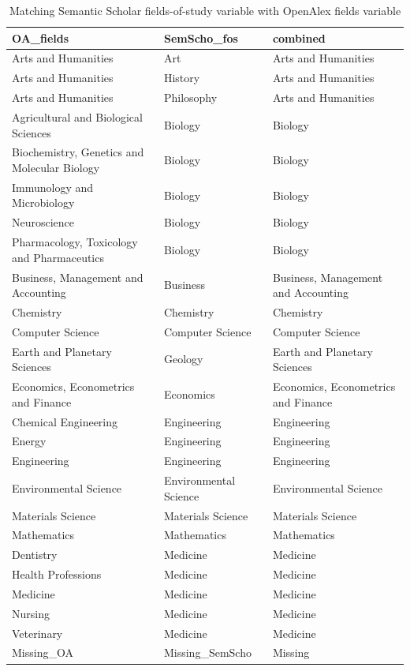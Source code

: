\begin{table}
\caption{Matching Semantic Scholar fields-of-study variable with OpenAlex fields variable}
\label{tab:fos_matching}
\begin{tabular}{lll}
\toprule
OA_fields & SemScho_fos & combined \\
\midrule
Arts and Humanities & Art & Arts and Humanities \\
Arts and Humanities & History & Arts and Humanities \\
Arts and Humanities & Philosophy & Arts and Humanities \\
Agricultural and Biological Sciences & Biology & Biology \\
Biochemistry, Genetics and Molecular Biology & Biology & Biology \\
Immunology and Microbiology & Biology & Biology \\
Neuroscience & Biology & Biology \\
Pharmacology, Toxicology and Pharmaceutics & Biology & Biology \\
Business, Management and Accounting & Business & Business, Management and Accounting \\
Chemistry & Chemistry & Chemistry \\
Computer Science & Computer Science & Computer Science \\
Earth and Planetary Sciences & Geology & Earth and Planetary Sciences \\
Economics, Econometrics and Finance & Economics & Economics, Econometrics and Finance \\
Chemical Engineering & Engineering & Engineering \\
Energy & Engineering & Engineering \\
Engineering & Engineering & Engineering \\
Environmental Science & Environmental Science & Environmental Science \\
Materials Science & Materials Science & Materials Science \\
Mathematics & Mathematics & Mathematics \\
Dentistry & Medicine & Medicine \\
Health Professions & Medicine & Medicine \\
Medicine & Medicine & Medicine \\
Nursing & Medicine & Medicine \\
Veterinary & Medicine & Medicine \\
Missing_OA & Missing_SemScho & Missing \\

\end{tabular}
\end{table}
